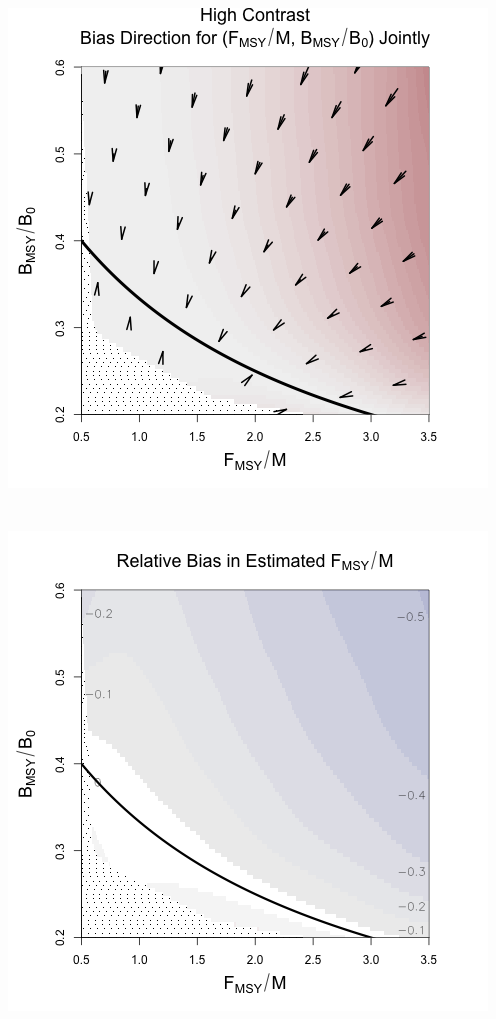 \documentclass[ xcolor = pdftex, dvipsnames, table ]{beamer}
\begin{document}
\begin{frame}
\begin{minipage}[h!]{0.46\textwidth}
\end{minipage}
\begin{minipage}[h!]{0.44\textwidth}
$~$\\
\vspace{-1cm}
\hspace*{-0.1cm}
\includegraphics[height=0.49\textheight]{../../gpBias/directionalBiasSchnuteSubTitleExpT45N150Wide.png}\\
$~$\\$~$\\
\hspace*{0.1cm}
\includegraphics[height=0.49\textheight]{../../gpBias/fMSYRelBiasSchnuteExpT45N150Wide.png}

\end{minipage}
\end{frame}
\end{document}
